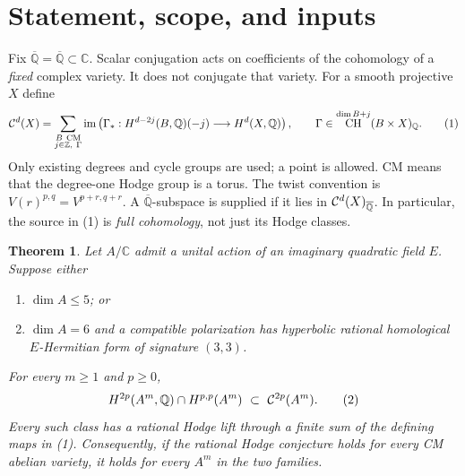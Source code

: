 \documentclass[11pt]{article}
\newcommand{\Q}{\mathbb Q}
\newcommand{\C}{\mathbb C}
\newcommand{\Z}{\mathbb Z}
\newcommand{\kk}{{\overline{\mathbb Q}}}
\DeclareMathOperator{\CH}{CH}
\DeclareMathOperator{\im}{im}
\newtheorem{theorem}{Theorem}
\theoremstyle{remark}
\begin{document}
\section{Statement, scope, and inputs}

Fix $\kk=\overline{\Q}\subset\C$. Scalar conjugation acts on coefficients
of the cohomology of a \emph{fixed} complex variety. It does not conjugate
that variety. For a smooth projective $X$ define
\[
 {\cal C}^{d}(X)=
 \sum_{\substack{B\ {\rm CM}\\ j\in\Z,\ \Gamma}}
 \im\left(\Gamma_*:H^{d-2j}(B,\Q)(-j)
                 \longrightarrow H^d(X,\Q)\right),\qquad
 \Gamma\in\CH^{\dim B+j}(B\times X)_\Q.
 \tag{1}\label{eq:supply}
\]
Only existing degrees and cycle groups are used; a point is allowed.
CM means that the degree-one Hodge group is a torus.
The twist convention is $V(r)^{p,q}=V^{p+r,q+r}$.
A $\kk$-subspace is supplied if it lies in ${\cal C}^d(X)_\kk$.
In particular, the source in (1) is \emph{full cohomology}, not just
its Hodge classes.

\begin{theorem}\label{thm:main}
Let $A/\C$ admit a unital action of an imaginary quadratic field $E$.
Suppose either
\begin{enumerate}
\item $\dim A\leq5$; or
\item $\dim A=6$ and a compatible polarization has hyperbolic rational
homological $E$-Hermitian form of signature $(3,3)$.
\end{enumerate}
For every $m\geq1$ and $p\geq0$,
\[
 H^{2p}(A^m,\Q)\cap H^{p,p}(A^m)
             \ \subset\ {\cal C}^{2p}(A^m).
 \tag{2}\label{eq:main}
\]
Every such class has a rational Hodge lift through a finite sum of
the defining maps in (1).
Consequently, \emph{if} the rational Hodge conjecture holds for every
CM abelian variety, it holds for every $A^m$ in the two families.
\end{theorem}
\end{document}
